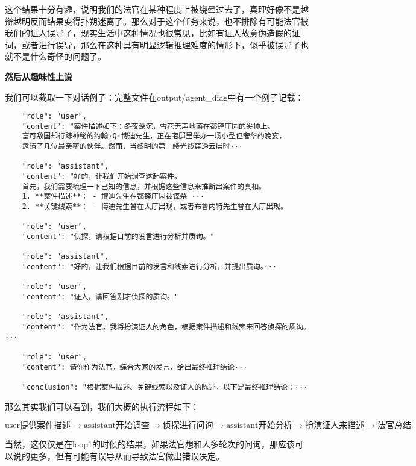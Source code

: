 \documentclass[answers]{exam}  %
\begin{document}
这个结果十分有趣，说明我们的法官在某种程度上被绕晕过去了，真理好像不是越辩越明反而结果变得扑朔迷离了。那么对于这个任务来说，也不排除有可能法官被我们的证人误导了，现实生活中这种情况也很常见，比如有证人故意伪造假的证词，或者进行误导，那么在这种具有明显逻辑推理难度的情形下，似乎被误导了也就不是什么奇怪的问题了。

\textbf{然后从趣味性上说}

我们可以截取一下对话例子：完整文件在output/agent\_diag中有一个例子记载：

\begin{lstlisting}
    "role": "user",
    "content": "案件描述如下：冬夜深沉，雪花无声地落在都铎庄园的尖顶上。
    富可敌国却行踪神秘的约翰·Q·博迪先生，正在宅邸里举办一场小型但奢华的晚宴，
    邀请了几位最亲密的伙伴。然而，当黎明的第一缕光线穿透云层时···

    "role": "assistant",
    "content": "好的，让我们开始调查这起案件。
    首先，我们需要梳理一下已知的信息，并根据这些信息来推断出案件的真相。
    1. **案件描述**： - 博迪先生在都铎庄园被谋杀 ···
    2. **关键线索**： - 博迪先生曾在大厅出现，或者布鲁内特先生曾在大厅出现。

    "role": "user",
    "content": "侦探，请根据目前的发言进行分析并质询。"

    "role": "assistant",
    "content": "好的，让我们根据目前的发言和线索进行分析，并提出质询。···

    "role": "user",
    "content": "证人，请回答刚才侦探的质询。"

    "role": "assistant",
    "content": "作为法官，我将扮演证人的角色，根据案件描述和线索来回答侦探的质询。···

    "role": "user",
    "content": 请你作为法官，综合大家的发言，给出最终推理结论···

    "conclusion": "根据案件描述、关键线索以及证人的陈述，以下是最终推理结论：···
\end{lstlisting}

那么其实我们可以看到，我们大概的执行流程如下：

\begin{equation*}
    \text{user提供案件描述}\rightarrow\text{assistant开始调查}\rightarrow\text{侦探进行问询}\rightarrow\text{assistant开始分析}\rightarrow\text{扮演证人来描述}\rightarrow\text{法官总结}
\end{equation*}

当然，这仅仅是在loop1的时候的结果，如果法官想和人多轮次的问询，那应该可以说的更多，但有可能有误导从而导致法官做出错误决定。
\end{document}

